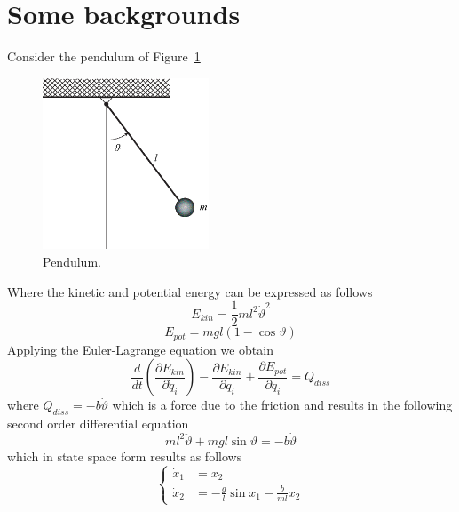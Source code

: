 \documentclass[11pt,a4paper,oneside]{book}
\numberwithin{equation}{section}
\theoremstyle{it}
\theoremstyle{definition}
\begin{document}
\section{Some backgrounds} 
Consider the pendulum of Figure~\ref{pendulum2} 
\begin{figure}[H]
	\centering
	\includegraphics[width = 140pt, 
	keepaspectratio]{figures/ljapunov/pendulum2.eps}
	\captionsetup{width=0.75\textwidth}		
	\caption{Pendulum.}
	\label{pendulum2}
\end{figure}
Where the kinetic and potential energy can be expressed as follows 
\begin{equation*}
	E_{kin} = \frac{1}{2}ml^2\dot{\vartheta}^2
\end{equation*}
\begin{equation*}
	E_{pot} = mgl(1-\cos\vartheta)
\end{equation*}
Applying the Euler-Lagrange equation we obtain
\begin{equation*}
	\frac{d}{dt}\left(\frac{\partial E_{kin}}{\partial \dot{q}_i} \right) - 
	\frac{\partial E_{kin}}{\partial q_i} + \frac{\partial E_{pot}}{\partial 
	q_i} = Q_{diss}
\end{equation*}
where $Q_{diss} = -b\dot{\vartheta}$ which is a force due to the friction and 
results in the following second order differential equation
\begin{equation}
	ml^2\ddot{\vartheta} +mgl\sin\vartheta = -b\dot{\vartheta} 
\end{equation}
which in state space form results as follows
\begin{equation}
	\left\lbrace \begin{aligned}
		\dot{x}_1 &=  x_2 \\[6pt] 
		\dot{x}_2 &= -\frac{g}{l}\sin x_1 -\frac{b}{ml}x_2
	\end{aligned}\right. 
\end{equation}
\end{document}
